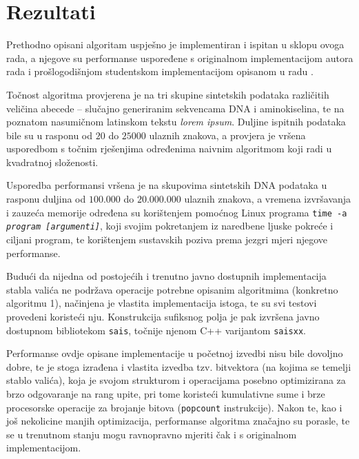 \documentclass[a4paper,12pt]{article}
\begin{document}

\section{Rezultati}

Prethodno opisani algoritam uspješno je implementiran i ispitan u sklopu ovoga rada, a njegove su performanse uspoređene s originalnom implementacijom autora rada \cite{beller2013} i prošlogodišnjom studentskom implementacijom opisanom u radu \cite{studenti2017}.

Točnost algoritma provjerena je na tri skupine sintetskih podataka različitih veličina abecede -- slučajno generiranim sekvencama DNA i aminokiselina, te na poznatom nasumičnom latinskom tekstu \textit{lorem ipsum}. Duljine ispitnih podataka bile su u rasponu od $20$ do $25000$ ulaznih znakova, a provjera je vršena usporedbom s točnim rješenjima određenima naivnim algoritmom koji radi u kvadratnoj složenosti.

Usporedba performansi vršena je na skupovima sintetskih DNA podataka u rasponu duljina od $100.000$ do $20.000.000$ ulaznih znakova, a vremena izvršavanja i zauzeća memorije određena su korištenjem pomoćnog Linux programa \texttt{time -a \textit{program [argumenti]}}, koji svojim pokretanjem iz naredbene ljuske pokreće i ciljani program, te korištenjem sustavskih poziva prema jezgri mjeri njegove performanse.

Budući da nijedna od postojećih i trenutno javno dostupnih implementacija stabla valića ne podržava operacije potrebne opisanim algoritmima (konkretno algoritmu 1), načinjena je vlastita implementacija istoga, te su svi testovi provedeni koristeći nju. Konstrukcija sufiksnog polja je pak izvršena javno dostupnom bibliotekom \texttt{sais}, točnije njenom C++ varijantom \texttt{saisxx}.

Performanse ovdje opisane implementacije u početnoj izvedbi nisu bile dovoljno dobre, te je stoga izrađena i vlastita izvedba tzv. bitvektora (na kojima se temelji stablo valića), koja je svojom strukturom i operacijama posebno optimizirana za brzo odgovaranje na rang upite, pri tome koristeći kumulativne sume i brze procesorske operacije za brojanje bitova (\texttt{popcount} instrukcije). Nakon te, kao i još nekolicine manjih optimizacija, performanse algoritma značajno su porasle, te se u trenutnom stanju mogu ravnopravno mjeriti čak i s originalnom implementacijom.
\end{document}
